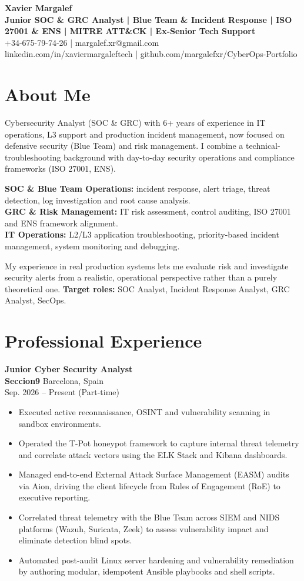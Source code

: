 \documentclass[10pt,a4paper]{article}
\begin{document}
{\Huge \textbf{Xavier Margalef}}\\
{\large \textbf{Junior SOC \& GRC Analyst | Blue Team \& Incident Response | ISO 27001 \& ENS | MITRE ATT\&CK | Ex-Senior Tech Support}}\\[2mm]
+34-675-79-74-26 | margalef.xr@gmail.com\\
linkedin.com/in/xaviermargaleftech | github.com/margalefxr/CyberOps-Portfolio

\section*{About Me}
Cybersecurity Analyst (SOC \& GRC) with 6+ years of experience in IT operations, L3 support and production incident management, now focused on defensive security (Blue Team) and risk management. I combine a technical-troubleshooting background with day-to-day security operations and compliance frameworks (ISO 27001, ENS).

\textbf{SOC \& Blue Team Operations:} incident response, alert triage, threat detection, log investigation and root cause analysis.\\
\textbf{GRC \& Risk Management:} IT risk assessment, control auditing, ISO 27001 and ENS framework alignment.\\
\textbf{IT Operations:} L2/L3 application troubleshooting, priority-based incident management, system monitoring and debugging.

My experience in real production systems lets me evaluate risk and investigate security alerts from a realistic, operational perspective rather than a purely theoretical one. \textbf{Target roles:} SOC Analyst, Incident Response Analyst, GRC Analyst, SecOps.

\section*{Professional Experience}
\textbf{Junior Cyber Security Analyst}\\
\textbf{Seccion9} \hfill Barcelona, Spain\\
Sep. 2026 -- Present (Part-time)

\begin{itemize}
\item Executed active reconnaissance, OSINT and vulnerability scanning in sandbox environments.
\item Operated the T-Pot honeypot framework to capture internal threat telemetry and correlate attack vectors using the ELK Stack and Kibana dashboards.
\item Managed end-to-end External Attack Surface Management (EASM) audits via Aion, driving the client lifecycle from Rules of Engagement (RoE) to executive reporting.
\item Correlated threat telemetry with the Blue Team across SIEM and NIDS platforms (Wazuh, Suricata, Zeek) to assess vulnerability impact and eliminate detection blind spots.
\item Automated post-audit Linux server hardening and vulnerability remediation by authoring modular, idempotent Ansible playbooks and shell scripts.
\end{itemize}
\end{document}
